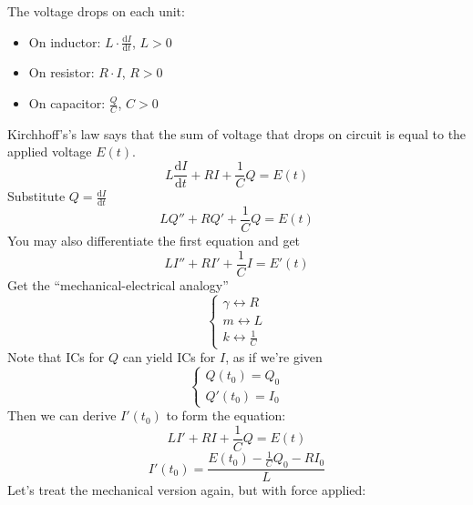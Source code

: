 \documentclass{article}
\newcommand{\mathd}{\mathrm{d}}
\begin{document}
The voltage drops on each unit:
\begin{itemize}
  \item On inductor: $L \cdot \frac{\mathd I}{\mathd t}$, \quad$L > 0$
  
  \item On resistor: $R \cdot I$, \quad$R > 0$
  
  \item On capacitor: $\frac{Q}{C}$, \quad$C > 0$
\end{itemize}
Kirchhoff's's law says that the sum of voltage that drops on circuit is equal
to the applied voltage $E (t)$.
\[ L \frac{\mathd I}{\mathd t} + RI + \frac{1}{C} Q = E (t) \]
Substitute $Q = \frac{\mathd I}{\mathd t}$
\[ LQ'' + RQ' + \frac{1}{C} Q = E (t) \]
You may also differentiate the first equation and get
\[ LI'' + RI' + \frac{1}{C} I = E' (t) \]
Get the ``mechanical-electrical analogy''
\[ \left\{\begin{array}{l}
     \gamma \leftrightarrow R\\
     m \leftrightarrow L\\
     k \leftrightarrow \frac{1}{C}
   \end{array}\right. \]
Note that ICs for $Q$ can yield ICs for $I$, as if we're given
\[ \left\{\begin{array}{l}
     Q (t_0) = Q_0\\
     Q' (t_0) = I_0
   \end{array}\right. \]
Then we can derive $I' (t_0)$ to form the equation:
\[ LI' + RI + \frac{1}{C} Q = E (t) \]
\[ I' (t_0) = \frac{E (t_0) - \frac{1}{C} Q_0 - RI_0}{L} \]
Let's treat the mechanical version again, but with force applied:

\

\
\end{document}
